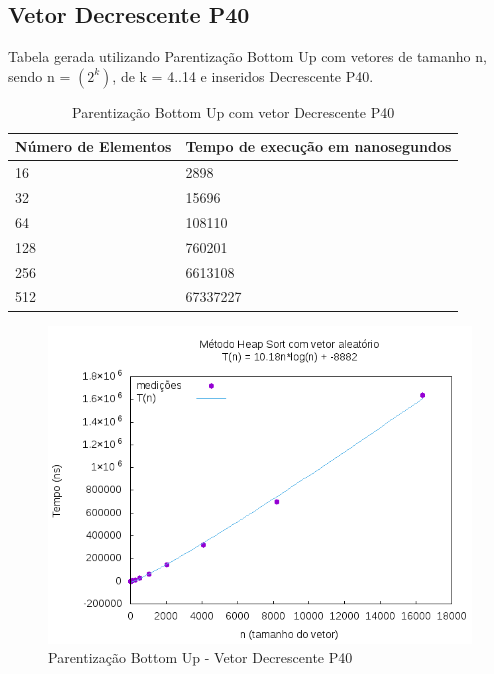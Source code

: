 \documentclass[12pt,a4paper,twoside]{report}
\begin{document}
\subsection{Vetor Decrescente P40}
Tabela gerada utilizando Parentização Bottom Up com vetores de tamanho n, sendo n = $(2^k)$, de k = 4..14 e inseridos Decrescente P40.
\begin{table}[H]
\centering
\caption{Parentização Bottom Up com vetor Decrescente P40}
\label{my-label}
\begin{tabular}{|l|l|}
\hline
\multicolumn{1}{|c|}{\textbf{Número de Elementos}} & \multicolumn{1}{c|}{\textbf{Tempo de execução em nanosegundos}} \\ \hline
16 & 2898 \\ \hline
32 & 15696 \\ \hline
64 & 108110 \\ \hline
128 & 760201 \\ \hline
256 & 6613108 \\ \hline
512 & 67337227 \\ \hline
\end{tabular}
\end{table}

\begin{figure}[H]
    \centering
    \includegraphics[width=0.7\linewidth]{graficos/HeapSort/vIntAleatorio/vIntAleatorio.png}
  \caption{Parentização Bottom Up - Vetor Decrescente P40}
\end{figure}
\end{document}
